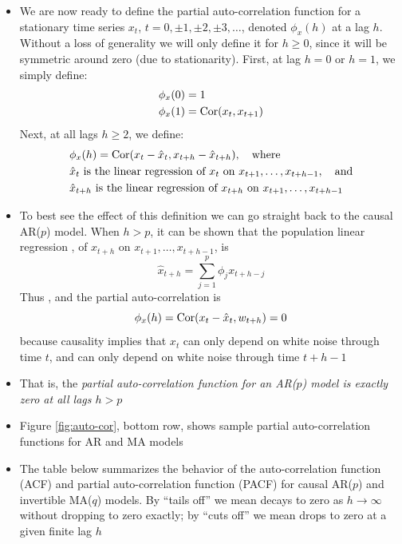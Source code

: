 \documentclass{article}
\begin{document}
\begin{itemize}
\item We are now ready to define the partial auto-correlation function for a
  stationary time series $x_t$, $t = 0, \pm 1, \pm 2, \pm 3, \dots$, denoted
  $\phi_x(h)$ at a lag $h$. Without a loss of generality we will only define it
  for $h \geq 0$, since it will be symmetric around zero (due to stationarity). 
  First, at lag $h=0$ or $h=1$, we simply define: 
  \begin{align*}
  \phi_x(0) &= 1 \\
  \phi_x(1) &= \operatorname{Cor}(x_t, x_{t+1}) 
  \end{align*}
  Next, at all lags $h \geq 2$, we define: 
  \begin{align*}
  &\phi_x(h) = \operatorname{Cor}(x_t - \hat{x}_t, x_{t+h} - \hat{x}_{t+h}), \quad
    \text{where} \\ 
  &\text{$\hat{x}_t$ is the linear regression of $x_t$ on
    $x_{t+1},\dots,x_{t+h-1}$}, \quad \text{and} \\ 
  &\text{$\hat{x}_{t+h}$ is the linear regression of $x_{t+h}$ on 
    $x_{t+1},\dots,x_{t+h-1}$}  
  \end{align*}

\item To best see the effect of this definition we can go straight back to the
  causal AR($p$) model. When $h>p$, it can be shown that the population linear 
  regression , of $x_{t+h}$ on $x_{t+1},\dots,x_{t+h-1}$, 
  is 
  \[
  \hat{x}_{t+h} = \sum_{j=1}^p \phi_j x_{t+h-j}
  \]
  Thus , and the partial auto-correlation is
  \[
  \phi_x(h) = \operatorname{Cor}(x_t - \hat{x}_t, w_{t+h}) = 0
  \]
  because causality implies that $x_t$ can only depend on white noise through
  time $t$, and  can only depend on white noise through time
  $t+h-1$ 

\item That is, the \emph{partial auto-correlation function for an AR($p$) model
  is exactly zero at all lags $h > p$}

\item Figure \ref{fig:auto-cor}, bottom row, shows sample partial
  auto-correlation functions for AR and MA models

\item The table below summarizes the behavior of the auto-correlation function
  (ACF) and partial auto-correlation function (PACF) for causal AR($p$) and
  invertible MA($q$) models. By ``tails off'' we mean decays to zero as $h \to
  \infty$ without dropping to zero exactly; by ``cuts off'' we mean drops to
  zero at a given finite lag $h$


\end{itemize}
\end{document}
